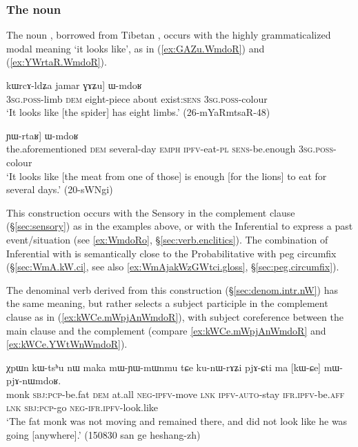 \subsubsection{The noun  } \label{sec:WmdoR.TAME}
The noun , borrowed from Tibetan , occurs with the highly grammaticalized modal meaning `it looks like', as in (\ref{ex:GAZu.WmdoR}) and (\ref{ex:YWrtaR.WmdoR}).  


\begin{exe}
	\ex \label{ex:GAZu.WmdoR}
	\gll [ɯ-mɤlɤjaʁ nɯ, [...] kɯrcɤ-ldʑa jamar ɣɤʑu] ɯ-mdoʁ \\
	\textsc{3sg}.\textsc{poss}-limb \textsc{dem} { } eight-piece about exist:\textsc{sens} \textsc{3sg}.\textsc{poss}-colour \\
	\glt `It looks like [the spider] has eight limbs.' (26-mYaRmtsaR-48) 
\end{exe}

\begin{exe}
	\ex \label{ex:YWrtaR.WmdoR}
	\gll    [iɕqʰa nɯ [kɤntɕʰɯ-sŋi ʑo tu-ndza-nɯ] ɲɯ-rtaʁ] ɯ-mdoʁ  \\
	the.aforementioned \textsc{dem} several-day \textsc{emph} \textsc{ipfv}-eat-\textsc{pl} \textsc{sens}-be.enough \textsc{3sg}.\textsc{poss}-colour \\
	\glt `It looks like [the meat from one of those] is enough [for the lions] to eat for several days.' (20-sWNgi)
\end{exe}

This construction occurs with the Sensory in the complement clause (§\ref{sec:sensory}) as in the examples above, or with the Inferential to express a past event/situation (see \ref{ex:WmdoRo}, §\ref{sec:verb.enclitics}). The combination of Inferential with  is semantically close to the Probabilitative with peg circumfix (§\ref{sec:WmA.kW.ci}, see also \ref{ex:WmAjakWzGWtci.gloss}, §\ref{sec:peg.circumfix}).

The denominal verb   derived from this construction (§\ref{sec:denom.intr.nW}) has the same meaning, but rather selects a subject participle in the complement clause as in (\ref{ex:kWCe.mWpjAnWmdoR}), with subject coreference between the main clause and the complement (compare \ref{ex:kWCe.mWpjAnWmdoR} and \ref{ex:kWCe.YWtWnWmdoR}).


\begin{exe}
	\ex \label{ex:kWCe.mWpjAnWmdoR}
	\gll  χpɯn kɯ-tsʰu nɯ maka mɯ-ɲɯ-mɯnmu tɕe ku-nɯ-rɤʑi pjɤ-ɕti ma [kɯ-ɕe] mɯ-pjɤ-nɯmdoʁ. \\
	monk \textsc{sbj}:\textsc{pcp}-be.fat \textsc{dem} at.all \textsc{neg}-\textsc{ipfv}-move \textsc{lnk} \textsc{ipfv}-\textsc{auto}-stay \textsc{ifr}.\textsc{ipfv}-be.\textsc{aff} \textsc{lnk} \textsc{sbj}:\textsc{pcp}-go \textsc{neg}-\textsc{ifr}.\textsc{ipfv}-look.like \\
	\glt `The fat monk was not moving and remained there, and did not look like he was going [anywhere].'  (150830 san ge heshang-zh)
\end{exe}

